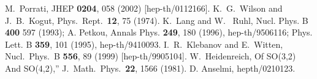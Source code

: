 \documentclass[a4paper,12pt]{article}
\begin{document}
\begin{thebibliography}{9}
 M.~Porrati,
JHEP {\bf 0204}, 058 (2002)
[hep-th/0112166].
 K.~G.~Wilson and J.~B.~Kogut,
Phys.\ Rept.\  {\bf 12}, 75 (1974). 
 K.~Lang and W.~ Ruhl, 
Nucl. Phys. B {\bf 400} 597 (1993); A. Petkou, 
Annals  Phys. {\bf 249}, 180
(1996), hep-th/9506116; Phys. Lett. B {\bf 359}, 101 (1995), 
hep-th/9410093.
 I.~R.~Klebanov and E.~Witten,
Nucl.\ Phys.\ B {\bf 556}, 89 (1999)
[hep-th/9905104].
 W.~Heidenreich,
Of SO(3,2) And SO(4,2),''
J.\ Math.\ Phys.\  {\bf 22}, 1566 (1981).
 D. Anselmi, hepth/0210123.
\end{thebibliography}
\end{document}
